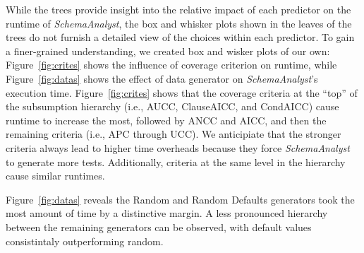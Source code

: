 
While the trees provide insight into the relative impact of each predictor on the runtime of \textit{SchemaAnalyst}, the
box and whisker plots shown in the leaves of the trees do not furnish a detailed view of the choices within each
predictor.  To gain a finer-grained understanding, we created box and wisker plots of our own:  Figure~\ref{fig:crites}
shows the influence of coverage criterion on runtime, while Figure~\ref{fig:datas} shows the effect of data generator on
{\em SchemaAnalyst}'s execution time.  Figure~\ref{fig:crites} shows that the coverage criteria at the ``top'' of the
subsumption hierarchy (i.e., AUCC, ClauseAICC, and CondAICC) cause runtime to increase the most, followed by ANCC and
AICC, and then the remaining criteria (i.e., APC through UCC).  We anticipiate that the stronger criteria always lead to
higher time overheads because they force {\em SchemaAnalyst} to generate more tests. Additionally, criteria at the same
level in the hierarchy cause similar runtimes. 

Figure~\ref{fig:datas} reveals the Random and Random Defaults generators took the most amount of time by a distinctive
margin. A less pronounced hierarchy between the remaining generators can be observed, with default values consistintaly
outperforming random.

